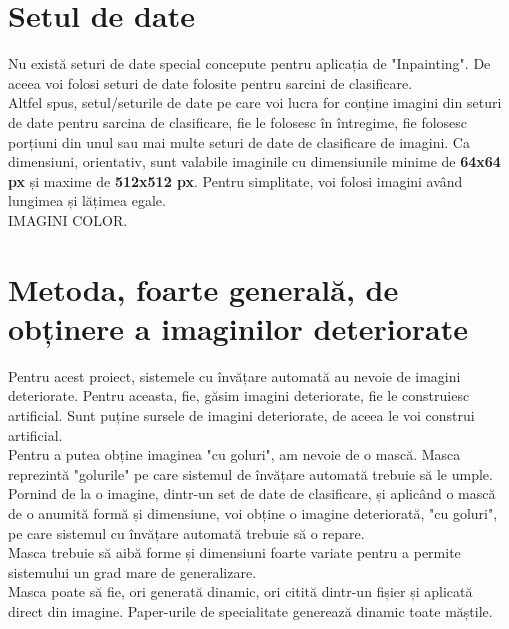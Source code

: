 \documentclass[12pt, a4paper]{article}
\begin{document}
\section{Setul de date}
Nu există seturi de date special concepute pentru aplicația de "Inpainting". De aceea voi folosi seturi de date folosite pentru sarcini de clasificare.\\
Altfel spus, setul/seturile de date pe care voi lucra for conține imagini din seturi de date pentru sarcina de clasificare, fie le folosesc în întregime, fie folosesc porțiuni din unul sau mai multe seturi de date de clasificare de imagini.
Ca dimensiuni, orientativ, sunt valabile imaginile cu dimensiunile minime de \textbf{64x64 px} și maxime de \textbf{512x512 px}. Pentru simplitate, voi folosi imagini având lungimea și lățimea egale.\\
IMAGINI COLOR.

\section{Metoda, foarte generală, de obținere a imaginilor deteriorate}
Pentru acest proiect, sistemele cu învățare automată au nevoie de imagini deteriorate. Pentru aceasta, fie, găsim imagini deteriorate, fie le construiesc artificial. Sunt puține sursele de imagini deteriorate, de aceea le voi construi artificial.\\
Pentru a putea obține imaginea "cu goluri", am nevoie de o mască. Masca reprezintă "golurile" pe care sistemul de învățare automată trebuie să le umple.\\
Pornind de la o imagine, dintr-un set de date de clasificare, și aplicând o mască de o anumită formă și dimensiune, voi obține o imagine deteriorată, "cu goluri", pe care sistemul cu învățare automată trebuie să o repare.\\
Masca trebuie să aibă forme și dimensiuni foarte variate pentru a permite sistemului un grad mare de generalizare.\\
Masca poate să fie, ori generată dinamic, ori citită dintr-un fișier și aplicată direct din imagine. Paper-urile de specialitate generează dinamic toate măștile.
\end{document}
